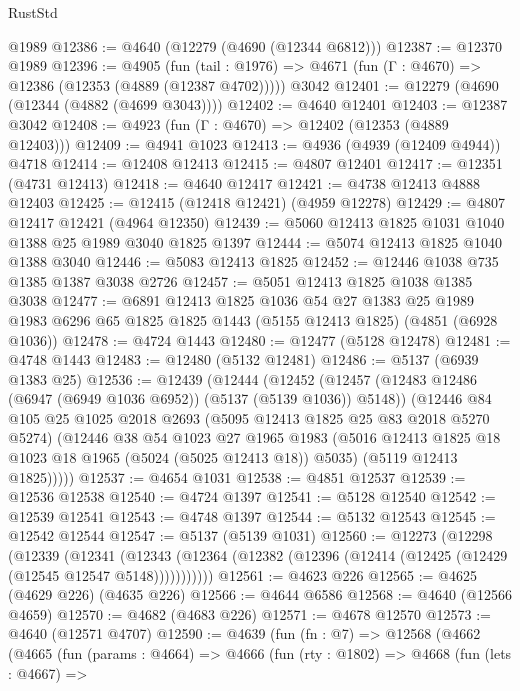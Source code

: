 \begin{lexlean}{RustStd}
\begin{coremodule}
    @1989
@12386 := @4640 (@12279 (@4690 (@12344 @6812)))
@12387 := @12370 @1989
@12396 := @4905
    (fun (tail : @1976) => @4671 (fun (Γ : @4670) => @12386 (@12353 (@4889 (@12387 @4702)))))
    @3042
@12401 := @12279 (@4690 (@12344 (@4882 (@4699 @3043))))
@12402 := @4640 @12401
@12403 := @12387 @3042
@12408 := @4923 (fun (Γ : @4670) => @12402 (@12353 (@4889 @12403)))
@12409 := @4941 @1023
@12413 := @4936 (@4939 (@12409 @4944)) @4718
@12414 := @12408 @12413
@12415 := @4807 @12401
@12417 := @12351 (@4731 @12413)
@12418 := @4640 @12417
@12421 := @4738 @12413 @4888 @12403
@12425 := @12415 (@12418 @12421) (@4959 @12278)
@12429 := @4807 @12417 @12421 (@4964 @12350)
@12439 := @5060 @12413 @1825 @1031 @1040 @1388 @25 @1989 @3040 @1825 @1397
@12444 := @5074 @12413 @1825 @1040 @1388 @3040
@12446 := @5083 @12413 @1825
@12452 := @12446 @1038 @735 @1385 @1387 @3038 @2726
@12457 := @5051 @12413 @1825 @1038 @1385 @3038
@12477 := @6891
    @12413
    @1825
    @1036
    @54
    @27
    @1383
    @25
    @1989
    @1983
    @6296
    @65
    @1825
    @1825
    @1443
    (@5155 @12413 @1825)
    (@4851 (@6928 @1036))
@12478 := @4724 @1443
@12480 := @12477 (@5128 @12478)
@12481 := @4748 @1443
@12483 := @12480 (@5132 @12481)
@12486 := @5137 (@6939 @1383 @25)
@12536 := @12439
    (@12444
      (@12452
        (@12457 (@12483 @12486 (@6947 (@6949 @1036 @6952)) (@5137 (@5139 @1036)) @5148))
        (@12446
          @84
          @105
          @25
          @1025
          @2018
          @2693
          (@5095 @12413 @1825 @25 @83 @2018 @5270 @5274)
          (@12446
            @38
            @54
            @1023
            @27
            @1965
            @1983
            (@5016 @12413 @1825 @18 @1023 @18 @1965 (@5024 (@5025 @12413 @18)) @5035)
            (@5119 @12413 @1825)))))
@12537 := @4654 @1031
@12538 := @4851 @12537
@12539 := @12536 @12538
@12540 := @4724 @1397
@12541 := @5128 @12540
@12542 := @12539 @12541
@12543 := @4748 @1397
@12544 := @5132 @12543
@12545 := @12542 @12544
@12547 := @5137 (@5139 @1031)
@12560 := @12273
    (@12298
      (@12339
        (@12341
          (@12343 (@12364 (@12382 (@12396 (@12414 (@12425 (@12429 (@12545 @12547 @5148)))))))))))
@12561 := @4623 @226
@12565 := @4625 (@4629 @226) (@4635 @226)
@12566 := @4644 @6586
@12568 := @4640 (@12566 @4659)
@12570 := @4682 (@4683 @226)
@12571 := @4678 @12570
@12573 := @4640 (@12571 @4707)
@12590 := @4639
    (fun (fn : @7) =>
    @12568
      (@4662
        (@4665
          (fun (params : @4664) =>
          @4666
            (fun (rty : @1802) =>
            @4668
              (fun (lets : @4667) =>

\end{coremodule}
\end{lexlean}
